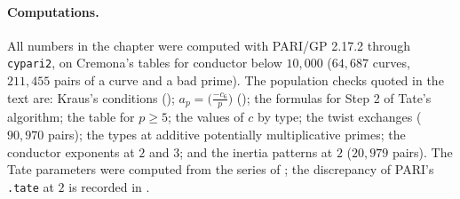 \paragraph{Computations.} All numbers in the chapter were computed with PARI/GP 2.17.2 \cite{PARI} through \texttt{cypari2}, on Cremona's
tables \cite{ecdata} for conductor below $10{,}000$ ($64{,}687$ curves, $211{,}455$ pairs of a curve and a bad prime). The population checks
quoted in the text are: Kraus's conditions (); $a_p=\bigl(\frac{-c_6}{p}\bigr)$
(); the formulas for Step 2 of Tate's algorithm; the table for $p\ge5$; the values of $c$ by type; the twist
exchanges ($90{,}970$ pairs); the types at additive potentially multiplicative primes; the conductor exponents at $2$ and $3$; and the inertia
patterns at $2$ ($20{,}979$ pairs). The Tate parameters were computed from the series of ; the discrepancy of
PARI's \texttt{.tate} at $2$ is recorded in .
